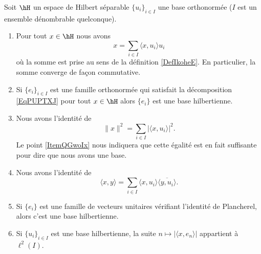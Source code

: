 \begin{theorem}     \label{ThoyAjoqP}
    Soit \( \hH\) un espace de Hilbert séparable \( \{ u_i \}_{i\in I}\) une base orthonormée (\( I\) est un ensemble dénombrable quelconque). 

    \begin{enumerate}
        \item \label{ItemQGwoIxi}
            Pour tout \( x\in \hH\) nous avons
            \begin{equation}        \label{EqPUPTXJ}
                x=\sum_{i\in I}\langle x, u_i\rangle u_i
            \end{equation}
            où la somme est prise au sens de la définition \ref{DefIkoheE}. En particulier, la somme converge de façon commutative.

        \item

            Si \( \{ e_i \}_{i\in I}\) est une famille orthonormée qui satisfait la décomposition \eqref{EqPUPTXJ} pour tout \( x\in \hH\) alors \( \{ e_i \}\) est une base hilbertienne.
        \item
            Nous avons l'identité de 
            \begin{equation}
                \| x \|^2=\sum_{i\in I}| \langle x, u_i\rangle  |^2.
            \end{equation}
            Le point \ref{ItemQGwoIx} nous indiquera que cette égalité est en fait suffisante pour dire que nous avons une base.
        \item
            Nous avons l'identité de 
            \begin{equation}    \label{EqHZxjtKt}
                \langle x, y\rangle =\sum_{i\in I}\langle x, u_i\rangle \overline{ \langle y, u_i\rangle  }.
            \end{equation}
        \item   \label{ItemQGwoIx}
            Si \( \{ e_i \}\) est une famille de vecteurs unitaires vérifiant l'identité de Plancherel, alors c'est une base hilbertienne.
        \item
            Si \( \{ u_i \}_{i\in I}\) est une base hilbertienne, la suite \( n\mapsto| \langle x, e_n\rangle  |\) appartient à \( \ell^2(I)\).
    \end{enumerate}
\end{theorem}

